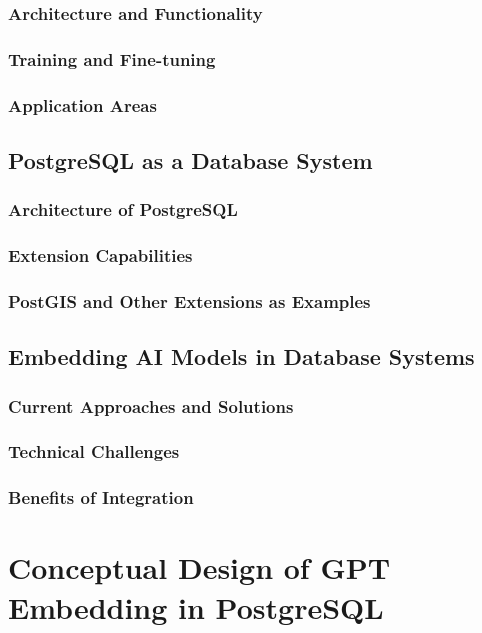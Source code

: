 \documentclass{article}
\begin{document}
\subsubsection{Architecture and Functionality}
\subsubsection{Training and Fine-tuning}
\subsubsection{Application Areas}

\subsection{PostgreSQL as a Database System}
\subsubsection{Architecture of PostgreSQL}
\subsubsection{Extension Capabilities}
\subsubsection{PostGIS and Other Extensions as Examples}

\subsection{Embedding AI Models in Database Systems}
\subsubsection{Current Approaches and Solutions}
\subsubsection{Technical Challenges}
\subsubsection{Benefits of Integration}

\newpage

\section{Conceptual Design of GPT Embedding in PostgreSQL}
\end{document}
